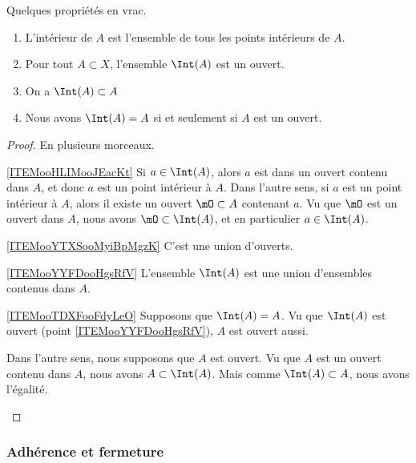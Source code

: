 \begin{lemma}
    Quelques propriétés en vrac.
    \begin{enumerate}
        \item   \label{ITEMooHLIMooJEacKt}
            L'intérieur de \( A\) est l'ensemble de tous les points intérieurs de \( A\).
        \item \label{ITEMooYTXSooMyiBpMgzK}
            Pour tout \( A \subset X\), l'ensemble \( \Int(A)\) est un ouvert.
\item   \label{ITEMooYYFDooHgsRfV}
    On a  \( \Int(A) \subset A \)
\item \label{ITEMooTDXFooFdyLeO}
        Nous avons \( \Int(A) = A \) si et seulement si $A$ est un ouvert.
    \end{enumerate}
\end{lemma}

\begin{proof}
    En plusieurs morceaux.
    \begin{subproof}
    \item[\ref{ITEMooHLIMooJEacKt}]
        Si \( a\in\Int(A)\), alors \( a\) est dans un ouvert contenu dans \( A\), et donc \( a\) est un point intérieur à \( A\). Dans l'autre sens, si \( a\) est un point intérieur à \( A\), alors il existe un ouvert \( \mO\subset A\) contenant \( a\). Vu que \( \mO\) est un ouvert dans \( A\), nous avons \( \mO\subset\Int(A)\), et en particulier \( a\in \Int(A)\).
    \item[\ref{ITEMooYTXSooMyiBpMgzK}]
            C'est une union d'ouverts.
    \item[\ref{ITEMooYYFDooHgsRfV}]
        L'ensemble \( \Int(A)\) est une union d'ensembles contenus dans \( A\).
    \item[\ref{ITEMooTDXFooFdyLeO}]
        Supposons que \( \Int(A)=A\). Vu que \( \Int(A)\) est ouvert (point \ref{ITEMooYYFDooHgsRfV}), \( A\) est ouvert aussi.

        Dans l'autre sens, nous supposons que \( A\) est ouvert. Vu que \( A\) est un ouvert contenu dans \( A\), nous avons \( A\subset\Int(A)\). Mais comme \( \Int(A)\subset A\), nous avons l'égalité.
    \end{subproof}
\end{proof}

\subsubsection{Adhérence et fermeture}


